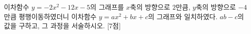 이차함수 $y=-2x^2-12x-5$의 그래프를 $x$축의 방향으로 $2$만큼, $y$축의 방향으로 $-4$만큼 평행이동하였더니 이차함수 $y=ax^2+bx+c$의 그래프와 일치하였다. $ab-c$의 값을 구하고, 그 과정을 서술하시오.  \mbox{[7점]}
